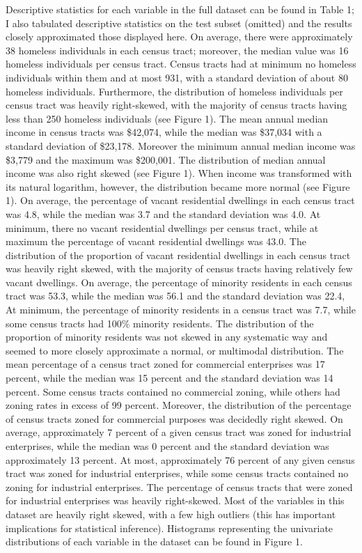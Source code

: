 \documentclass[titlepage]{article}   	%
\begin{document}
\indent Descriptive statistics for each variable in the full dataset can be found in Table 1; I also tabulated descriptive statistics on the test subset (omitted) and the results closely approximated those displayed here. On average, there were approximately 38 homeless individuals in each census tract; moreover, the median value was 16 homeless individuals per census tract. Census tracts had at minimum no homeless individuals within them and at most 931, with a standard deviation of about 80 homeless individuals. Furthermore, the distribution of homeless individuals per census tract was heavily right-skewed, with the majority of census tracts having less than 250 homeless individuals (see Figure 1). The mean annual median income in census tracts was \$42,074, while the median was \$37,034 with a standard deviation of \$23,178. Moreover the minimum annual median income was \$3,779 and the maximum was \$200,001. The distribution of median annual income was also right skewed (see Figure 1). When income was transformed with its natural logarithm, however, the distribution became more normal (see Figure 1). On average, the percentage of vacant residential dwellings in each census tract was 4.8, while the median was 3.7 and the standard deviation was 4.0. At minimum, there no vacant residential dwellings per census tract, while at maximum the percentage of vacant residential dwellings was 43.0. The distribution of the proportion of vacant residential dwellings in each census tract was heavily right skewed, with the majority of census tracts having relatively few vacant dwellings. On average, the percentage of minority residents in each census tract was 53.3, while the median was 56.1 and the standard deviation was 22.4, At minimum, the percentage of minority residents in a census tract was 7.7, while some census tracts had 100\% minority residents. The distribution of the proportion of minority residents was not skewed in any systematic way and seemed to more closely approximate a normal, or multimodal distribution. The mean percentage of a census tract zoned for commercial enterprises was 17 percent, while the median was 15 percent and the standard deviation was 14 percent. Some census tracts contained no commercial zoning, while others had zoning rates in excess of 99 percent. Moreover, the distribution of the percentage of census tracts zoned for commercial purposes was decidedly right skewed. On average, approximately 7 percent of a given census tract was zoned for industrial enterprises, while the median was 0 percent and the standard deviation was approximately 13 percent. At most, approximately 76 percent of any given census tract was zoned for industrial enterprises, while some census tracts contained no zoning for industrial enterprises. The percentage of census tracts that were zoned for industrial enterprises was heavily right-skewed. Most of the variables in this dataset are heavily right skewed, with a few high outliers (this has important implications for statistical inference). Histograms representing the univariate distributions of each variable in the dataset can be found in Figure 1.
\end{document}
